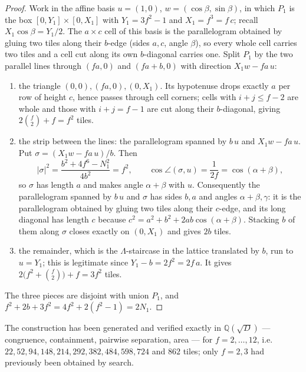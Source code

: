 \documentclass[11pt,reqno]{amsart}
\theoremstyle{plain}
\theoremstyle{definition}
\newcommand{\Q}{\mathbb{Q}}
\begin{document}
\begin{proof}
Work in the affine basis $u=(1,0)$, $w=(\cos\beta,\sin\beta)$, in which $P_1$ is the box
$[0,Y_1]\times[0,X_1]$ with $Y_1=3f^2-1$ and $X_1=f^3=f\,c$; recall $X_1\cos\beta=Y_1/2$. The
$a\times c$ cell of this basis is the parallelogram obtained by gluing two tiles along their
$b$-edge (sides $a,c$, angle $\beta$), so every whole cell carries two tiles and a cell cut along
its own $b$-diagonal carries one. Split $P_1$ by the two parallel lines through $(fa,0)$ and
$(fa+b,0)$ with direction $X_1w-fa\,u$:
\begin{enumerate}
\item[$\Lambda$] the triangle $(0,0),(fa,0),(0,X_1)$. Its hypotenuse drops exactly $a$ per row of
height $c$, hence passes through cell corners; cells with $i+j\le f-2$ are whole and those with
$i+j=f-1$ are cut along their $b$-diagonal, giving $2\binom f2+f=f^2$ tiles.
\item[$\Sigma$] the strip between the lines: the parallelogram spanned by $b\,u$ and
$X_1w-fa\,u$. Put $\sigma=(X_1w-fa\,u)/b$. Then
\[
|\sigma|^2=\frac{b^2+4f^6-N_1^2}{4b^2}=f^2,\qquad
\cos\angle(\sigma,u)=\frac1{2f}=\cos(\alpha+\beta),
\]
so $\sigma$ has length $a$ and makes angle $\alpha+\beta$ with $u$. Consequently the
parallelogram spanned by $b\,u$ and $\sigma$ has sides $b,a$ and angles $\alpha+\beta,\gamma$:
it is the parallelogram obtained by gluing two tiles along their $c$-edge, and its long diagonal
has length $c$ because $c^2=a^2+b^2+2ab\cos(\alpha+\beta)$. Stacking $b$ of them along $\sigma$
closes exactly on $(0,X_1)$ and gives $2b$ tiles.
\item[P] the remainder, which is the $\Lambda$-staircase in the lattice translated by $b$, run to
$u=Y_1$; this is legitimate since $Y_1-b=2f^2=2f\,a$. It gives $2\bigl(f^2+\binom f2\bigr)+f=3f^2$
tiles.
\end{enumerate}
The three pieces are disjoint with union $P_1$, and $f^2+2b+3f^2=4f^2+2(f^2-1)=2N_1$.
\end{proof}

The construction has been generated and verified exactly in $\Q(\sqrt D)$ --- congruence,
containment, pairwise separation, area --- for $f=2,\dots,12$, i.e.\ $22,52,94,148,214,292,382,
484,598,724$ and $862$ tiles; only $f=2,3$ had previously been obtained by search.
\end{document}
